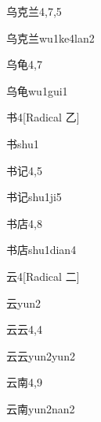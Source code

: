 \begin{entry}{乌克兰}{4,7,5}
  \begin{phonetics}{乌克兰}{wu1ke4lan2}
  \end{phonetics}
\end{entry}

\begin{entry}{乌龟}{4,7}
  \begin{phonetics}{乌龟}{wu1gui1}
  \end{phonetics}
\end{entry}

\begin{entry}{书}{4}[Radical 乙]
  \begin{phonetics}{书}{shu1}
  \end{phonetics}
\end{entry}

\begin{entry}{书记}{4,5}
  \begin{phonetics}{书记}{shu1ji5}
  \end{phonetics}
\end{entry}

\begin{entry}{书店}{4,8}
  \begin{phonetics}{书店}{shu1dian4}
  \end{phonetics}
\end{entry}

\begin{entry}{云}{4}[Radical 二]
  \begin{phonetics}{云}{yun2}
  \end{phonetics}
\end{entry}

\begin{entry}{云云}{4,4}
  \begin{phonetics}{云云}{yun2yun2}
  \end{phonetics}
\end{entry}

\begin{entry}{云南}{4,9}
  \begin{phonetics}{云南}{yun2nan2}
  \end{phonetics}
\end{entry}

